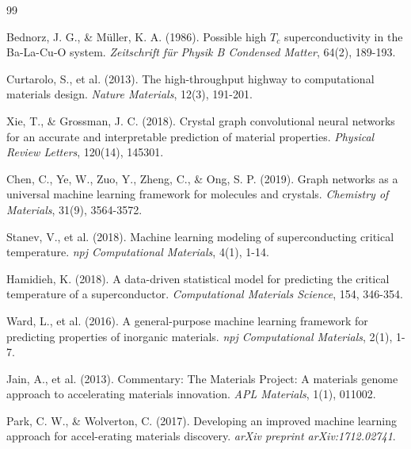 \documentclass[11pt,a4paper]{article}
\begin{document}

\begin{thebibliography}{99}

Bednorz, J. G., \& M\"uller, K. A. (1986). Possible high $T_c$ superconductivity in the Ba-La-Cu-O system. \textit{Zeitschrift f\"ur Physik B Condensed Matter}, 64(2), 189-193.

Curtarolo, S., et al. (2013). The high-throughput highway to computational materials design. \textit{Nature Materials}, 12(3), 191-201.

Xie, T., \& Grossman, J. C. (2018). Crystal graph convolutional neural networks for an accurate and interpretable prediction of material properties. \textit{Physical Review Letters}, 120(14), 145301.

Chen, C., Ye, W., Zuo, Y., Zheng, C., \& Ong, S. P. (2019). Graph networks as a universal machine learning framework for molecules and crystals. \textit{Chemistry of Materials}, 31(9), 3564-3572.

Stanev, V., et al. (2018). Machine learning modeling of superconducting critical temperature. \textit{npj Computational Materials}, 4(1), 1-14.

Hamidieh, K. (2018). A data-driven statistical model for predicting the critical temperature of a superconductor. \textit{Computational Materials Science}, 154, 346-354.

Ward, L., et al. (2016). A general-purpose machine learning framework for predicting properties of inorganic materials. \textit{npj Computational Materials}, 2(1), 1-7.

Jain, A., et al. (2013). Commentary: The Materials Project: A materials genome approach to accelerating materials innovation. \textit{APL Materials}, 1(1), 011002.

Park, C. W., \& Wolverton, C. (2017). Developing an improved machine learning approach for accel-erating materials discovery. \textit{arXiv preprint arXiv:1712.02741}.

\end{thebibliography}
\end{document}
